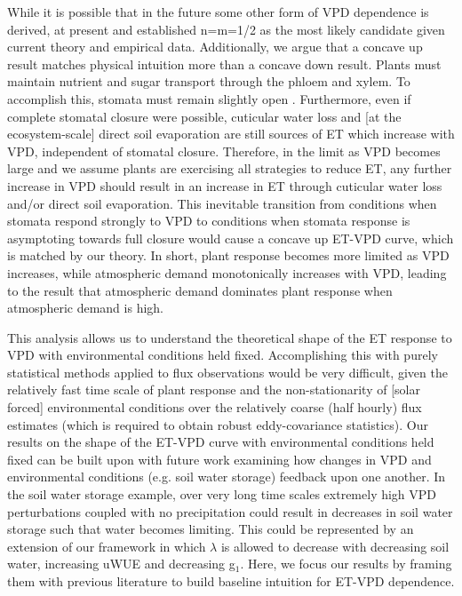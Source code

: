 While it is possible that in the future some other form of VPD
dependence is derived, at present \cite{MEDLYN_2011} and
\cite{Zhou_2014} established n=m=1/2 as the most likely candidate
given current theory and empirical data. Additionally, we argue that a
concave up result matches physical intuition more than a concave down
result. Plants must maintain nutrient and sugar transport through the
phloem and xylem. To accomplish this, stomata must remain slightly
open \cite{De_2013, Nikinmaa_2013, Ryan_2014}. Furthermore, even if
complete stomatal closure were possible, cuticular water loss and [at
the ecosystem-scale] direct soil evaporation are still sources of ET
which increase with VPD, independent of stomatal closure. Therefore,
in the limit as VPD becomes large and we assume plants are exercising
all strategies to reduce ET, any further increase in VPD should result
in an increase in ET through cuticular water loss and/or direct soil
evaporation. This inevitable transition from conditions when stomata
respond strongly to VPD to conditions when stomata response is
asymptoting towards full closure would cause a concave up ET-VPD
curve, which is matched by our theory. In short, plant response
becomes more limited as VPD increases, while atmospheric demand
monotonically increases with VPD, leading to the result that
atmospheric demand dominates plant response when atmospheric demand is
high.

This analysis allows us to understand the theoretical shape of the ET
response to VPD with environmental conditions held
fixed. Accomplishing this with purely statistical methods applied to
flux observations would be very difficult, given the relatively fast
time scale of plant response and the non-stationarity of [solar
forced] environmental conditions over the relatively coarse (half
hourly) flux estimates (which is required to obtain robust
eddy-covariance statistics). Our results on the shape of the ET-VPD
curve with environmental conditions held fixed can be built upon with
future work examining how changes in VPD and environmental conditions
(e.g. soil water storage) feedback upon one another. In the soil water
storage example, over very long time scales extremely high VPD
perturbations coupled with no precipitation could result in decreases
in soil water storage such that water becomes limiting. This could be
represented by an extension of our framework in which $\lambda$ is
allowed to decrease with decreasing soil water, increasing uWUE and
decreasing g$_1$. Here, we focus our results by framing them with
previous literature to build baseline intuition for ET-VPD dependence.
